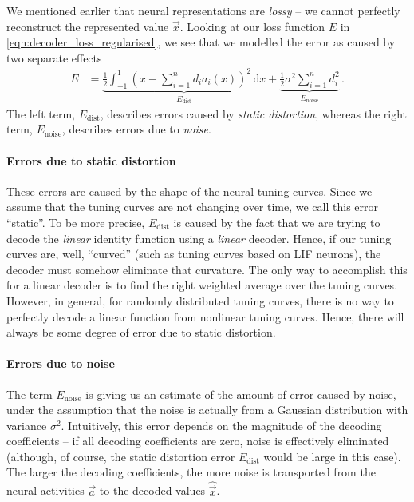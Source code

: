 \documentclass[10pt,letterpaper,oneside]{article}
\begin{document}
We mentioned earlier that neural representations are \emph{lossy} -- we cannot perfectly reconstruct the represented value $\vec x$. Looking at our loss function $E$ in \cref{eqn:decoder_loss_regularised}, we see that we modelled the error as caused by two separate effects
\begin{align}
E &= \underbrace{\frac{1}2 \int_{-1}^1 \left(x - \sum_{i = 1}^n d_i a_i(x) \right)^2 \,\mathrm{d}x}_{E_\mathrm{dist}} + \underbrace{\frac{1}2 \sigma^2 \sum_{i = 1}^n d_i^2}_{E_\mathrm{noise}} \,.
\label{eqn:decoder_loss_regularised_sources}
\end{align}
The left term, $E_\mathrm{dist}$, describes errors caused by \emph{static distortion}, whereas the right term, $E_\mathrm{noise}$, describes errors due to \emph{noise}.

\paragraph{Errors due to static distortion}
These errors are caused by the shape of the neural tuning curves. Since we assume that the tuning curves are not changing over time, we call this error \enquote{static}. To be more precise, $E_\mathrm{dist}$ is caused by the fact that we are trying to decode the \emph{linear} identity function using a \emph{linear} decoder. Hence, if our tuning curves are, well, \enquote{curved} (such as tuning curves based on LIF neurons), the decoder must somehow eliminate that curvature. The only way to accomplish this for a linear decoder is to find the right weighted average over the tuning curves. However, in general, for randomly distributed tuning curves, there is no way to perfectly decode a linear function from nonlinear tuning curves. Hence, there will always be some degree of error due to static distortion.


\paragraph{Errors due to noise}
The term $E_\mathrm{noise}$ is giving us an estimate of the amount of error caused by noise, under the assumption that the noise is actually from a Gaussian distribution with variance $\sigma^2$. Intuitively, this error depends on the magnitude of the decoding coefficients -- if all decoding coefficients are zero, noise is effectively eliminated (although, of course, the static distortion error $E_\mathrm{dist}$ would be large in this case). The larger the decoding coefficients, the more noise is transported from the neural activities $\vec a$ to the decoded values $\hat{\vec x}$.
\end{document}
